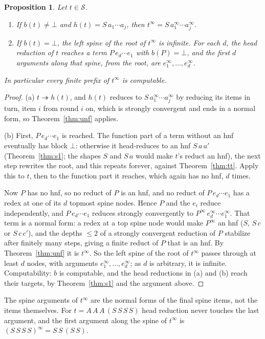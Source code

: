 \documentclass[11pt]{amsart}
\newtheorem{proposition}[theorem]{Proposition}
\theoremstyle{definition}
\theoremstyle{remark}
\newcommand{\Ter}{\mathcal S}
\begin{document}
\begin{proposition}\label{prop:compute}
Let $t\in\Ter$.
\begin{enumerate}
\item[(a)] If $b(t)\ne\bot$ and $h(t)=S\,a_1\cdots a_j$, then
  $t^\infty=S\,a_1^\infty\cdots a_j^\infty$.
\item[(b)] If $b(t)=\bot$, the left spine of the root of $t^\infty$ is infinite. For each $d$,
  the head reduction of $t$ reaches a term $P\,e_d\cdots e_1$ with $b(P)=\bot$, and the first
  $d$ arguments along that spine, from the root, are $e_1^\infty,\dots,e_d^\infty$.
\end{enumerate}
In particular every finite prefix of $t^\infty$ is computable.
\end{proposition}
\begin{proof}
(a) $t\twoheadrightarrow h(t)$, and $h(t)$ reduces to $S\,a_1^\infty\cdots a_j^\infty$ by
reducing its items in turn, item $i$ from round $i$ on, which is strongly convergent and ends
in a normal form, so Theorem~\ref{thm:unf} applies.

(b) First, $P\,e_d\cdots e_1$ is reached. The function part of a term without an hnf
eventually has block $\bot$: otherwise it head-reduces to an hnf $S\,a\,a'$ (Theorem~\ref{thm:s1};
the shapes $S$ and $S\,a$ would make $t$'s reduct an hnf), the next step rewrites the root,
and this repeats forever, against Theorem~\ref{thm:tt}. Apply this to $t$, then to the
function part it reaches, which again has no hnf, $d$ times.

Now $P$ has no hnf, so no reduct of $P$ is an hnf, and no reduct of $P\,e_d\cdots e_1$ has a
redex at one of its $d$ topmost spine nodes. Hence $P$ and the $e_i$ reduce independently,
and $P\,e_d\cdots e_1$ reduces strongly convergently to $P^\infty\,e_d^\infty\cdots e_1^\infty$.
That term is a normal form: a redex at a top spine node would make $P^\infty$ an hnf
($S$, $S\,c$ or $S\,c\,c'$), and the depths $\le2$ of a strongly convergent reduction of $P$ stabilize after
finitely many steps, giving a finite reduct of $P$ that is an hnf. By Theorem~\ref{thm:unf} it
is $t^\infty$. So the left spine of the root of $t^\infty$ passes through at least $d$ nodes,
with arguments $e_1^\infty,\dots,e_d^\infty$; as $d$ is arbitrary, it is infinite. Computability: $b$ is computable, and the head reductions in (a) and (b) reach their targets,
by Theorem~\ref{thm:s1} and the argument above.
\end{proof}

The spine arguments of $t^\infty$ are the normal forms of the final spine items, not the items
themselves. For $t=A\,A\,A\,
(S\,S\,S\,S)$ head reduction never touches the last argument, and the first argument
along the spine of $t^\infty$ is $(S\,S\,S\,S)^\infty=S\,S\,(S\,S)$.
\end{document}
